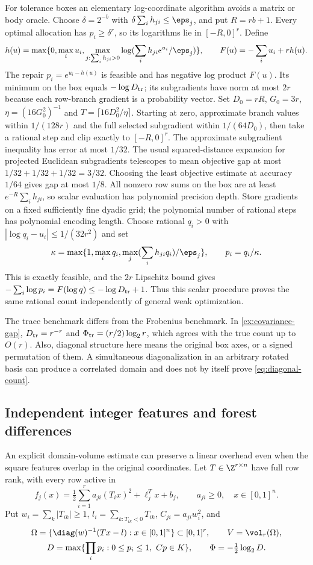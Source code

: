 For tolerance boxes an elementary log-coordinate algorithm avoids a
matrix or body oracle. Choose $\delta=2^{-b}$ with
$\delta\sum_i h_{ji}\le\eps_j$, and put $R=rb+1$. Every optimal
allocation has $p_i\ge\delta^r$, so its logarithms lie in $[-R,0]^r$.
Define
\[
 h(u)=\max\{0,\max_i u_i,
     \max_{j:\sum_i h_{ji}>0}\log(\sum_i h_{ji}e^{u_i}/\eps_j)\},
 \qquad F(u)=-\sum_i u_i+rh(u).
\]
The repair $p_i=e^{u_i-h(u)}$ is feasible and has negative log product
$F(u)$. Its minimum on the box equals $-\log D_{\rm tr}$; its
subgradients have norm at most $2r$ because each row-branch gradient
is a probability vector. Set $D_0=rR$, $G_0=3r$,
$\eta=(16G_0^2)^{-1}$ and $T=\lceil16D_0^2/\eta\rceil$. Starting
at zero, approximate branch values within $1/(128r)$ and the full
selected subgradient within $1/(64D_0)$, then take a rational step and
clip exactly to $[-R,0]^r$. The approximate subgradient inequality has
error at most $1/32$. The usual squared-distance expansion for projected
Euclidean subgradients telescopes to mean objective gap at most
$1/32+1/32+1/32=3/32$. Choosing the least objective estimate at accuracy
$1/64$ gives gap at most $1/8$.
All nonzero row sums on the box are at least
$e^{-R}\sum_i h_{ji}$, so scalar evaluation has polynomial precision
depth. Store gradients on a fixed sufficiently fine dyadic grid; the
polynomial number of rational steps has polynomial encoding length.
Choose rational $q_i>0$ with
$|\log q_i-u_i|\le1/(32r^2)$ and set
\[
 \kappa=\max\{1,\max_iq_i,\max_j(\sum_i h_{ji}q_i)/\eps_j\},
 \qquad p_i=q_i/\kappa.
\]
This is exactly feasible, and the $2r$ Lipschitz bound gives
$-\sum_i\log p_i=F(\log q)\le-\log D_{\rm tr}+1$.
Thus this scalar procedure proves the same rational count independently
of general weak optimization.

The trace benchmark differs from the Frobenius benchmark. In
\cref{ex:covariance-gap}, $D_{\rm tr}=r^{-r}$ and
$\Phi_{\rm tr}=(r/2)\log_2r$, which agrees with the true count up to
$O(r)$. Also, diagonal structure here means the original box axes, or
a signed permutation of them. A simultaneous diagonalization in an
arbitrary rotated basis can produce a correlated domain and does not
by itself prove \eqref{eq:diagonal-count}.

\subsection{Independent integer features and forest differences}

An explicit domain-volume estimate can preserve a linear overhead even
when the square features overlap in the original coordinates.
Let $T\in\Z^{r\times n}$ have full row rank, with every row active in
\[
 f_j(x)=\tfrac12\sum_{i=1}^r a_{ji}(T_ix)^2+\ell_j^Tx+b_j,
 \qquad a_{ji}\ge0,\quad x\in[0,1]^n.
\]
Put $w_i=\sum_k|T_{ik}|\ge1$, $l_i=\sum_{k:T_{ik}<0}T_{ik}$,
$C_{ji}=a_{ji}w_i^2$, and
\[
 \begin{gathered}
 \Omega=\{\diag(w)^{-1}(Tx-l):x\in[0,1]^n\}\subset[0,1]^r,
 \qquad V=\vol_r(\Omega),\\
 D=\max\{\prod_ip_i:0\le p_i\le1,\ Cp\in K\},
 \qquad\Phi=-\tfrac12\log_2D.
 \end{gathered}
\]

